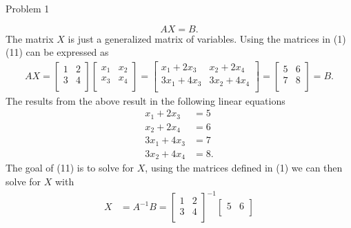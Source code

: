 \begin{problem}{Problem 1}
\begin{Highlight}[Solution]
        \begin{equation}
            AX = B.
        \end{equation}
        The matrix $X$ is just a generalized matrix of variables. Using the matrices in (1) (11) can be expressed as 
        \begin{align*}
            AX = 
            \begin{bmatrix}
                1 & 2 \\
                3 & 4 \\
            \end{bmatrix}
            \begin{bmatrix}
                x_{1} & x_{2} \\
                x_{3} & x_{4} \\
            \end{bmatrix}
            = 
            \begin{bmatrix}
                x_{1} + 2x_{3} & x_{2} + 2x_{4} \\
                3x_{1} + 4x_{3} & 3x_{2} + 4x_{4} \\
            \end{bmatrix}
            = 
            \begin{bmatrix}
                5 & 6 \\
                7 & 8 \\
            \end{bmatrix} = B.
        \end{align*}
        The results from the above result in the following linear equations
        \begin{align*}
            x_{1} + 2x_{3} & = 5 \\
            x_{2} + 2x_{4} & = 6 \\
            3x_{1} + 4x_{3} & = 7 \\
            3x_{2} + 4x_{4} & = 8.
        \end{align*}
        The goal of (11) is to solve for $X$, using the matrices defined in (1) we can then solve for $X$ with 
        \begin{align*}
            X & = A^{-1}B = 
            \begin{bmatrix}
                1 & 2 \\
                3 & 4 \\
            \end{bmatrix}^{-1}
            \begin{bmatrix}
                5 & 6 \\

\end{bmatrix}
\end{align*}
\end{Highlight}
\end{problem}
